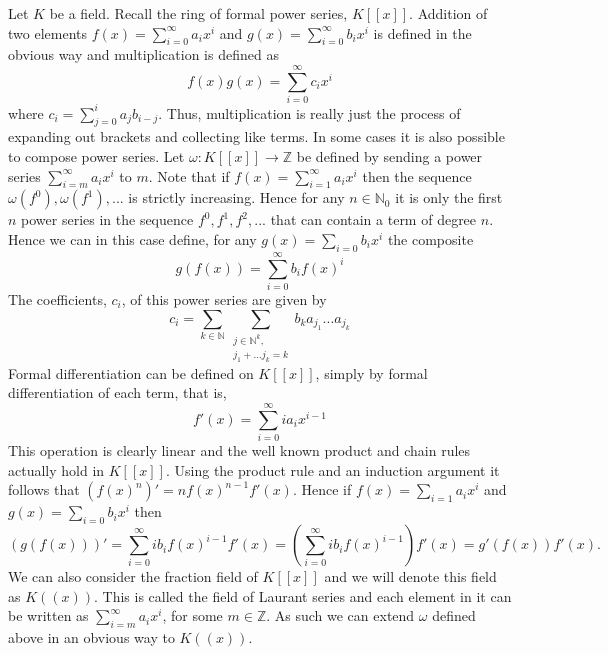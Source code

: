 \documentclass{article}
\newcommand{\mbb}[1]{\mathbb{#1}}
\begin{document}
Let $K$ be a field. Recall the ring of formal power series, $K[[x]]$. Addition of two elements $f(x) = \sum_{i = 0}^\infty a_ix^i$ and $g(x) = \sum_{i = 0}^\infty b_ix^i$ is defined in the obvious way and multiplication is defined as
$$f(x)g(x) = \sum_{i = 0}^{\infty}c_i x^i$$
where $c_i = \sum_{j = 0}^i a_j b_{i-j}$. Thus, multiplication is really just the process of expanding out brackets and collecting like terms. In some cases it is also possible to compose power series. Let $\omega : K[[x]] \to \mbb Z$ be defined by sending a power series $\sum_{i = m}^\infty a_i x^i$ to $m$. Note that if $f(x) = \sum_{i = 1}^\infty a_ix^i$ then the sequence $\omega(f^0), \omega(f^1), ...$ is strictly increasing. Hence for any $n \in \mbb N_0$ it is only the first $n$ power series in the sequence $f^0, f^1, f^2, ...$ that can contain a term of degree $n$. Hence we can in this case define, for any $g(x) = \sum_{i = 0} b_i x^i$ the composite
$$g(f(x)) = \sum_{i = 0}^\infty b_i f(x)^i$$
The coefficients, $c_i$, of this power series are given by 
$$c_i = \sum_{k \in \mbb N} \sum_{\substack{j \in \mbb N^k, \\ j_1 + ... j_k = k}} b_k a_{j_1}...a_{j_k} $$
Formal differentiation can be defined on $K[[x]]$, simply by formal differentiation of each term, that is, 
$$f'(x) = \sum_{i = 0}^\infty i a_{i} x^{i-1}$$
This operation is clearly linear and the well known product and chain rules actually hold in $K[[x]]$. Using the product rule and an induction argument it follows that $(f(x)^n)' = n f(x)^{n-1}f'(x)$. Hence if $f(x) = \sum_{i = 1} a_i x^i$ and $g(x) = \sum_{i = 0} b_i x^i$ then
$$(g(f(x)))' = \sum_{i = 0}^\infty ib_i f(x)^{i-1}f'(x) = (\sum_{i = 0}^\infty i b_i f(x)^{i-1})f'(x) = g'(f(x))f'(x).$$ 
We can also consider the fraction field of $K[[x]]$ and we will denote this field as $K((x))$. This is called the field of Laurant series and each element in it can be written as $\sum_{i = m}^\infty a_i x^i$, for some $m \in \mbb Z$. As such we can extend $\omega$ defined above in an obvious way to $K((x))$. 
\end{document}
